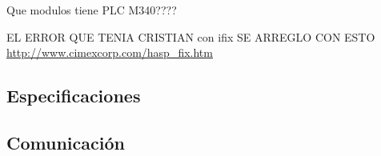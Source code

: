 Que modulos tiene PLC M340????

EL ERROR QUE TENIA CRISTIAN con ifix SE ARREGLO CON ESTO
\url{http://www.cimexcorp.com/hasp_fix.htm}
\subsection{Especificaciones}
\subsection{Comunicación}




	\newpage
